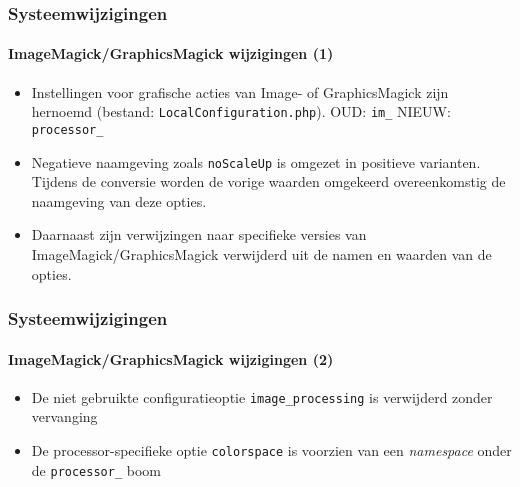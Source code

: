 \begin{frame}[fragile]
	\frametitle{Systeemwijzigingen}
	\framesubtitle{ImageMagick/GraphicsMagick wijzigingen (1)}

	\lstset{basicstyle=\tiny\ttfamily}

	\begin{itemize}

		\item Instellingen voor grafische acties van Image- of GraphicsMagick zijn hernoemd
			(bestand: \texttt{LocalConfiguration.php}).\newline
			OUD:\tabto{1.2cm} \texttt{im\_}\newline
			NIEUW:\tabto{1.2cm} \texttt{processor\_}

		\item Negatieve naamgeving zoals \texttt{noScaleUp} is omgezet in positieve varianten.
			Tijdens de conversie worden de vorige waarden omgekeerd overeenkomstig de naamgeving
			van deze opties.

		\item Daarnaast zijn verwijzingen naar specifieke versies van ImageMagick/GraphicsMagick
		 	verwijderd uit de namen en waarden van de opties.

	\end{itemize}

\end{frame}

\begin{frame}[fragile]
	\frametitle{Systeemwijzigingen}
	\framesubtitle{ImageMagick/GraphicsMagick wijzigingen (2)}

	\lstset{basicstyle=\tiny\ttfamily}

	\begin{itemize}

		\item De niet gebruikte configuratieoptie \texttt{image\_processing} is verwijderd zonder vervanging

		\item De processor-specifieke optie \texttt{colorspace} is voorzien van een \textit{namespace}
			onder de \texttt{processor\_} boom

	\end{itemize}

\end{frame}

